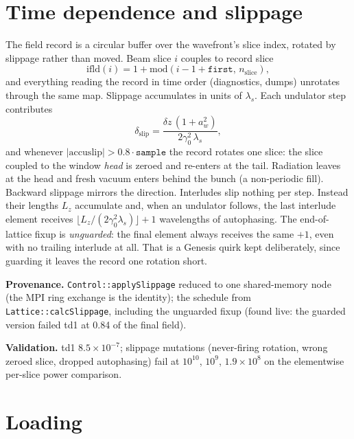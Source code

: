 \documentclass[11pt]{article}
\newcommand{\code}[1]{\texttt{#1}}
\newenvironment{provenance}{\par\small\textbf{Provenance.}}{\par}
\newenvironment{validation}{\par\small\textbf{Validation.}}{\par}
\begin{document}
\section{Time dependence and slippage}\label{sec:slippage}

The field record is a circular buffer over the wavefront's slice index, rotated by
slippage rather than moved. Beam slice $i$ couples to record slice
\begin{equation}\label{eq:fieldindex}
  \mathrm{ifld}(i) = 1 + \mathrm{mod}(i - 1 + \code{first},\, n_{\mathrm{slice}}),
\end{equation}
and everything reading the record in time order (diagnostics, dumps) unrotates through
the same map. Slippage accumulates in units of $\lambda_s$. Each undulator step
contributes
\begin{equation}\label{eq:slipstep}
  \delta_{\mathrm{slip}} = \frac{\delta z\,(1 + a_w^2)}{2\gamma_0^2\,\lambda_s},
\end{equation}
and whenever $|\mathrm{accuslip}| > 0.8\cdot\code{sample}$ the record rotates one
slice: the slice coupled to the window \emph{head} is zeroed and re-enters at the
tail. Radiation leaves at the head and fresh vacuum enters behind the bunch (a
non-periodic fill). Backward slippage mirrors the direction. Interludes slip nothing
per step. Instead their lengths $L_z$ accumulate and, when an undulator follows, the last
interlude element receives $\lfloor L_z/(2\gamma_0^2\lambda_s)\rfloor + 1$ wavelengths
of autophasing. The end-of-lattice fixup is \emph{unguarded}: the final element always
receives the same $+1$, even with no trailing interlude at all. That is a Genesis
quirk kept deliberately, since guarding it leaves the record one rotation short.

\begin{provenance}
\code{Control::applySlippage} reduced to one shared-memory node (the MPI ring exchange
is the identity); the schedule from \code{Lattice::calcSlippage}, including the
unguarded fixup (found live: the guarded version failed td1 at 0.84 of the final
field).
\end{provenance}
\begin{validation}
td1 $8.5\times10^{-7}$; slippage mutations (never-firing rotation, wrong zeroed slice,
dropped autophasing) fail at $10^{10}$, $10^{9}$, $1.9\times10^{8}$ on the elementwise
per-slice power comparison.
\end{validation}

\section{Loading}\label{sec:loading}
\end{document}
